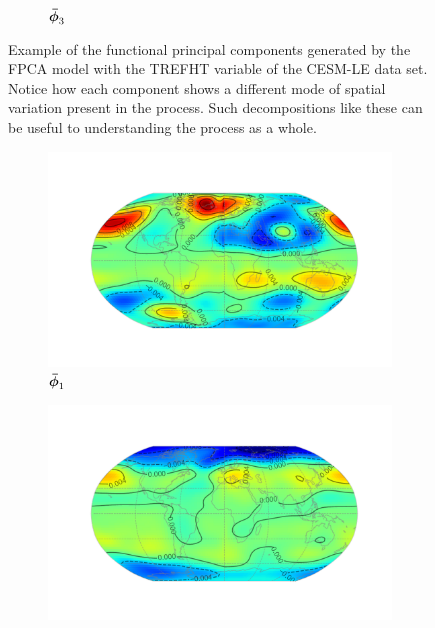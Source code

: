 \begin{figure}
\begin{subfigure}[b]{0.45\textwidth}
		\caption{$\bm{{\bar{\phi}}}_{3}$}
		\label{fig:ftsm_res_TREFHT_fpc_3}
	\end{subfigure}
	\caption[Example of the functional principal components generated by the FPCA model with the TREFHT variable.]{Example of the functional principal components generated by the FPCA model with the TREFHT variable of the CESM-LE data set. Notice how each component shows a different mode of spatial variation present in the process. Such decompositions like these can be useful to understanding the process as a whole.}
	\label{fig:ftsm_res_TREFHT_fpc}
\end{figure}

\begin{figure}
	\centering
	\begin{subfigure}[b]{0.45\textwidth}
		\includegraphics[width=\textwidth]{ftsm_res_PS_fpc_0}
		\caption{$\bm{{\bar{\phi}}}_{1}$}
		\label{fig:ftsm_res_PS_fpc_1}
	\end{subfigure}
	\vfill       
	\begin{subfigure}[b]{0.45\textwidth}
		\includegraphics[width=\textwidth]{ftsm_res_PS_fpc_1}

\end{subfigure}
\end{figure}
